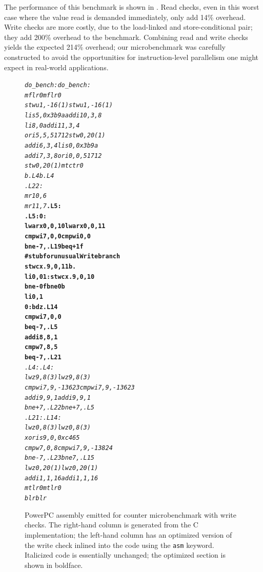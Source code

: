 
The performance of this benchmark is shown in .
Read checks, even in this worst case where the value read is demanded
immediately, only add 14\% overhead.  Write checks are more costly,
due to the load-linked and store-conditional pair; they add 200\%
overhead to the benchmark.  Combining read and write checks yields the
expected 214\% overhead; our microbenchmark was carefully constructed to
avoid the opportunities for instruction-level parallelism one might
expect in real-world applications.

\begin{figure}
\sis\fontsize{9}{10}\begin{alltt}
\textit{do_bench:              do_bench:
  mflr 0                 mflr 0
  stwu 1,-16(1)          stwu 1,-16(1)
  lis 5,0x3b9a           addi 10,3,8
  li 8,0                 addi 11,3,4
  ori 5,5,51712          stw 0,20(1)
  addi 6,3,4             lis 0,0x3b9a
  addi 7,3,8             ori 0,0,51712
  stw 0,20(1)            mtctr 0
  b .L4                  b .L4
.L22:
  mr 10,6
  mr 11,7              }\textbf{.L5:
.L5:                   0:
  lwarx 0,0,10           lwarx 0,0,11
  cmpwi 7,0,0            cmpwi 0,0
  bne- 7,.L19            beq+ 1f
                         # stub for unusualWrite branch
  stwcx. 9,0,11          b .
  li 0,0               1:stwcx. 9,0,10
  bne- 0f                bne 0b
  li 0,1
0:                       bdz .L14
  cmpwi 7,0,0
  beq- 7,.L5
  addi 8,8,1
  cmpw 7,8,5
  beq- 7,.L21}\textit{
.L4:                   .L4:
  lwz 9,8(3)             lwz 9,8(3)
  cmpwi 7,9,-13623       cmpwi 7,9,-13623
  addi 9,9,1             addi 9,9,1
  bne+ 7,.L22            bne+ 7,.L5
.L21:                  .L14:
  lwz 0,8(3)             lwz 0,8(3)
                         xoris 9,0,0xc465
  cmpw 7,0,8             cmpwi 7,9,-13824
  bne- 7,.L23            bne 7,.L15
  lwz 0,20(1)            lwz 0,20(1)
  addi 1,1,16            addi 1,1,16
  mtlr 0                 mtlr 0             
  blr                    blr}
\end{alltt}
\caption[PowerPC assembly emitted for counter microbenchmark with
  write checks.]{PowerPC assembly emitted for counter microbenchmark with
  write checks.  The right-hand column is generated from the C
  implementation; the left-hand column has an optimized version of the
  write check inlined into the code using the \texttt{asm} keyword.
  Italicized code is essentially unchanged; the optimized section is
  shown in boldface.}
\label{fig:write-assem}
\end{figure}
